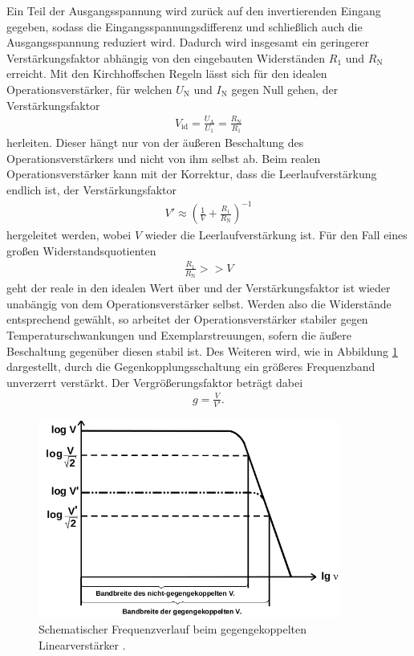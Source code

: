 Ein Teil der Ausgangsspannung wird zurück auf den invertierenden Eingang gegeben, sodass die Eingangsspannungsdifferenz
und schließlich auch die Ausgangsspannung reduziert wird. Dadurch wird insgesamt ein geringerer Verstärkungsfaktor abhängig von
den eingebauten Widerständen $R_1$ und $R_\text{N}$ erreicht. Mit den Kirchhoffschen Regeln lässt sich für den idealen
Operationsverstärker, für welchen $U_\text{N}$ und $I_\text{N}$ gegen Null gehen, der Verstärkungsfaktor
\begin{align}
  V_\text{id} = \frac{U_\text{A}}{U_\text{1}} = \frac{R_\text{N}}{R_1}
\end{align}
herleiten. Dieser hängt nur von der äußeren Beschaltung des Operationsverstärkers und nicht von ihm selbst ab.
Beim realen Operationsverstärker kann mit der Korrektur, dass die Leerlaufverstärkung endlich ist, der
Verstärkungsfaktor
\begin{align}
  V' \approx \left( \frac1{V} + \frac{R_1}{R_\text{N}} \right)^{-1}
  \label{eqn:leerlaufverst}
\end{align}
hergeleitet werden, wobei $V$ wieder die Leerlaufverstärkung ist. Für den Fall eines großen Widerstandsquotienten
\begin{align}
  \frac{R_1}{R_\text{N}} >> V
\end{align}
geht der reale in den idealen Wert über und der Verstärkungsfaktor ist wieder unabängig von dem Operationsverstärker selbst.
Werden also die Widerstände entsprechend gewählt, so arbeitet der Operationsverstärker stabiler gegen Temperaturschwankungen
und Exemplarstreuungen, sofern die äußere Beschaltung gegenüber diesen stabil ist.
Des Weiteren wird, wie in Abbildung \ref{fig:frequenzband} dargestellt, durch die Gegenkopplungsschaltung ein größeres Frequenzband unverzerrt verstärkt.
Der Vergrößerungsfaktor beträgt dabei
\begin{align}
  g = \frac{V}{V'}.
\end{align}

\begin{figure}
  \centering
  \includegraphics[height=6.5cm]{ImmerDieseNorweger/frequenzband.png}
  \caption{Schematischer Frequenzverlauf beim gegengekoppelten Linearverstärker \cite{anleitung}.}
  \label{fig:frequenzband}
\end{figure}

